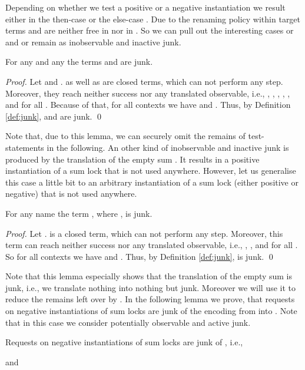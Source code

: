 \documentclass[]{llncs}
\begin{document}
Depending on whether we test a positive or a negative instantiation we result either in the then-case  or the else-case . Due to the renaming policy within target terms  and  are neither free in  nor in . So we can pull out the interesting cases  or  and  or  remain as inobservable and inactive junk.

\begin{lemma} \label{lem:junkTestStatement}
	For any  and any  the terms  and  are junk.
\end{lemma}

\begin{proof}
	Let  and .  as well as  are closed terms, which can not perform any step. Moreover, they reach neither success nor any translated observable, i.e., , , , , , and  for all . Because of that, for all contexts  we have  and . Thus, by Definition \ref{def:junk},  and  are junk.
	\qed
\end{proof}

Note that, due to this lemma, we can securely omit the remains of test-statements in the following. An other kind of inobservable and inactive junk is produced by the translation of the empty sum . It results in a positive instantiation of a sum lock that is not used anywhere. However, let us generalise this case a little bit to an arbitrary instantiation of a sum lock (either positive or negative) that is not used anywhere.

\begin{lemma} \label{lem:junkEmptySum}
	For any name  the term , where , is junk.
\end{lemma}

\begin{proof}
	Let .  is a closed term, which can not perform any step. Moreover, this term can reach neither success nor any translated observable, i.e., , , and  for all . So for all contexts  we have  and . Thus, by Definition \ref{def:junk},  is junk.
	\qed
\end{proof}
\noindent
Note that this lemma especially shows that the translation of the empty sum is junk, i.e., we translate nothing into nothing but junk. Moreover we will use it to reduce the remains left over by \simulations. In the following lemma we prove, that requests on negative instantiations of sum locks are junk of the encoding from \piMix into \piAsyn. Note that in this case we consider potentially observable and active junk.

\begin{lemma} \label{lem:junkRequestsOnFalseSumLocks}
	Requests on negative instantiations of sum locks are junk of , i.e.,
	
	and
	
\end{lemma}
\end{document}
